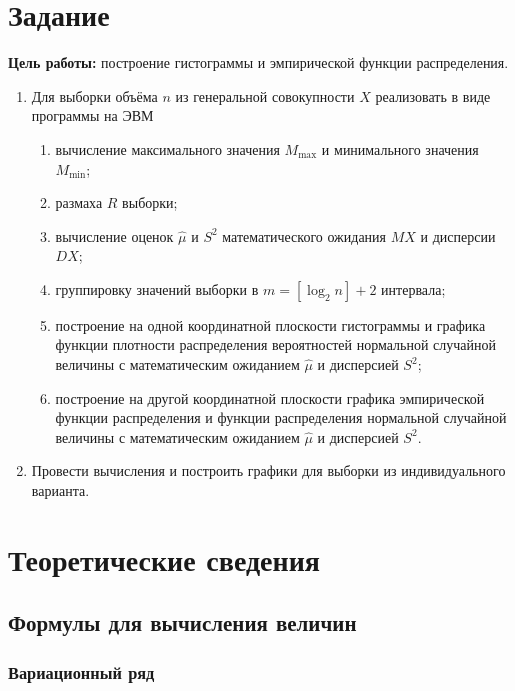 \chapter{Задание}

\textbf{Цель работы:} построение гистограммы и эмпирической функции распределения.

\begin{enumerate}
    \item Для выборки объёма $n$ из генеральной совокупности $X$ реализовать в виде программы на ЭВМ
        \begin{enumerate}
            \item вычисление максимального значения $M_{\max}$ и минимального значения $M_{\min}$;
            \item размаха $R$ выборки;
            \item вычисление оценок $\hat\mu$ и $S^2$ математического ожидания $MX$ и дисперсии $DX$;
            \item группировку значений выборки в $m = [\log_2 n] + 2$ интервала;
            \item построение на одной координатной плоскости гистограммы и графика функции плотности распределения вероятностей нормальной случайной величины с математическим ожиданием $\hat{\mu}$ и дисперсией $S^2$;
            \item построение на другой координатной плоскости графика эмпирической функции распределения и функции распределения нормальной случайной величины с математическим ожиданием $\hat{\mu}$ и дисперсией $S^2$.
        \end{enumerate}
    \item Провести вычисления и построить графики для выборки из индивидуального варианта.
\end{enumerate}

\chapter{Теоретические сведения}

\section{Формулы для вычисления величин}

\subsection{Вариационный ряд}

